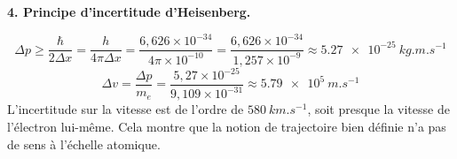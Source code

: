 \documentclass[12pt,a4paper]{article}
\begin{document}
\begin{boitecorrige}
\textbf{4. Principe d'incertitude d'Heisenberg.}

\[
\Delta p \geq \frac{\hbar}{2\Delta x} = \frac{h}{4\pi\Delta x} = \frac{6{,}626\times10^{-34}}{4\pi\times10^{-10}} = \frac{6{,}626\times10^{-34}}{1{,}257\times10^{-9}} \approx \qty{5.27e-25}{kg.m.s^{-1}}
\]
\[
\Delta v = \frac{\Delta p}{m_e} = \frac{5{,}27\times10^{-25}}{9{,}109\times10^{-31}} \approx \qty{5.79e5}{m.s^{-1}}
\]
L'incertitude sur la vitesse est de l'ordre de $\qty{580}{km.s^{-1}}$, soit presque la vitesse de l'électron lui-même. Cela montre que la notion de trajectoire bien définie n'a pas de sens à l'échelle atomique.
\end{boitecorrige}

\ifdefined\inMainDoc\else
\end{document}
